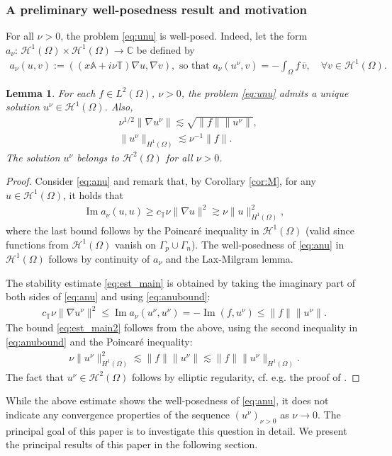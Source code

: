 \documentclass[report]{elsarticle}
\newtheorem{lemma}[theorem]{Lemma}
\numberwithin{theorem}{section}
\renewcommand{\Im}{\operatorname{Im}}
\renewcommand{\H}{\mathcal{H}}
\begin{document}
\subsubsection{A preliminary well-posedness result and motivation}
For all $\nu>0$, the problem \eqref{eq:unu} is well-posed. Indeed, let the form $a_{\nu}: \, \mathcal{H}^1(\Omega)\times \mathcal{H}^1(\Omega)\rightarrow \mathbb{C}$ be defined by
\begin{align}
	\label{eq:anu}
	a_{\nu}(u, v):=(( x \mathbb{A}+i\nu\mathbb{T})\nabla u, \nabla v), \text{ so that } a_{\nu}(u^{\nu}, v)=-\int_{\Omega}f\, \overline{v}, \quad \forall v\in \H^1(\Omega). 
\end{align}
\begin{lemma}
	\label{lem:pb_abs_wp}
	For each $f\in L^2(\Omega)$, $\nu>0$, the problem \eqref{eq:unu} admits a unique solution $u^{\nu}\in \mathcal{H}^1(\Omega)$. Also, 
	\begin{align}
		\label{eq:est_main}
		&\nu^{1/2}\|\nabla u^{\nu}\|\lesssim  \sqrt{\|f\|\|u^{\nu}\|},\\
		\label{eq:est_main2}
		& \|u^{\nu}\|_{H^1(\Omega)}\lesssim \nu^{-1}\|f\|. 
	\end{align}
	The solution $u^{\nu}$ belongs to  $\mathcal{H}^2(\Omega)$ for all $\nu>0$. 
\end{lemma}
\begin{proof}
	Consider \eqref{eq:anu} and remark that, by Corollary \ref{cor:M}, for any $u\in \mathcal{H}^1(\Omega)$, it holds that  
	\begin{align}
		\label{eq:anubound}
		\Im a_{\nu}(u, u)\geq c_{\mathbb{T}}\nu\|\nabla u\|^2\gtrsim \nu \|u\|^2_{H^1(\Omega)},
	\end{align}
	where the last bound follows by the Poincar\'e inequality in $\mathcal{H}^1(\Omega)$ (valid since functions from $\mathcal{H}^1(\Omega)$ vanish on $\Gamma_{p}\cup\Gamma_n$). The well-posedness of \eqref{eq:anu} in $\mathcal{H}^1(\Omega)$ follows by continuity of $a_{\nu}$ and the Lax-Milgram lemma.
	
	The stability estimate \eqref{eq:est_main} is obtained by taking the imaginary part of both sides of \eqref{eq:anu} and using  \eqref{eq:anubound}:
	\begin{align*}
		c_{\mathbb{T}}\nu\|\nabla u^{\nu}\|^2\leq \Im a_{\nu}(u^{\nu}, u^{\nu})=-\Im (f, u^{\nu})\leq \|f\|\|u^{\nu}\|.
	\end{align*}
	The bound \eqref{eq:est_main2} follows from the above, using the second inequality in \eqref{eq:anubound} and the Poincar\'e inequality:
	\begin{align*}
		\nu\| u^{\nu}\|^2_{H^1(\Omega)}\lesssim \|f\|\|u^{\nu}\|\lesssim \|f\|\|u^{\nu}\|_{H^1(\Omega)}.
	\end{align*}
	The fact that $u^{\nu}\in \mathcal{H}^2(\Omega)$ follows by elliptic regularity, cf. e.g. the proof of \cite[Theorem 4.18]{mclean}. 
\end{proof}
While the above estimate shows the well-posedness of \eqref{eq:anu}, it does not indicate any convergence properties of the sequence $(u^{\nu})_{\nu>0}$ as $\nu\rightarrow 0$.  The principal goal of this paper is to investigate this question in detail. We present the principal results of this paper in the following section. 
\end{document}
